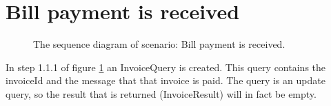 \section{Bill payment is received}

\begin{figure}
	\begin{centering}
		\caption{The sequence diagram of scenario: Bill payment is received.}
		\label{fig:scenario-5-14}
	\end{centering}
\end{figure}

\npar In step 1.1.1 of figure \ref{fig:scenario-5-14} an InvoiceQuery is
created. This query contains the invoiceId and the message that that invoice is
paid. The query is an update query, so the result that is returned
(InvoiceResult) will in fact be empty.
